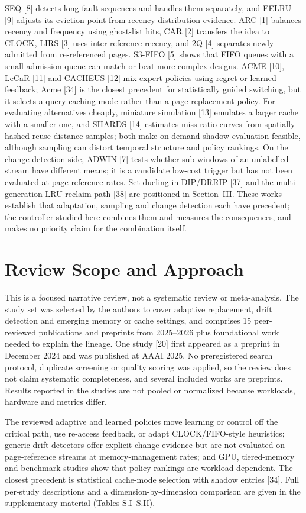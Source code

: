 \documentclass[10pt,twocolumn,a4paper]{IEEEtran}
\begin{document}
SEQ [8] detects long fault sequences and handles them separately, and EELRU
[9] adjusts its eviction point from recency-distribution evidence. ARC [1]
balances recency and frequency using ghost-list hits, CAR [2] transfers the
idea to CLOCK, LIRS [3] uses inter-reference recency, and 2Q [4] separates
newly admitted from re-referenced pages. S3-FIFO [5] shows that FIFO queues
with a small admission queue can match or beat more complex designs. ACME
[10], LeCaR [11] and CACHEUS [12] mix expert policies using regret or learned
feedback; Acme [34] is the closest precedent for statistically guided
switching, but it selects a query-caching mode rather than a page-replacement
policy. For evaluating alternatives cheaply, miniature simulation [13]
emulates a larger cache with a smaller one, and SHARDS [14] estimates
miss-ratio curves from spatially hashed reuse-distance samples; both make
on-demand shadow evaluation feasible, although sampling can distort temporal
structure and policy rankings. On the change-detection side, ADWIN [7] tests
whether sub-windows of an unlabelled stream have different means; it is a
candidate low-cost trigger but has not been evaluated at page-reference rates.
Set dueling in DIP/DRRIP [37] and the multi-generation LRU reclaim path [38]
are positioned in Section~III. These works establish that adaptation,
sampling and change detection each have precedent; the controller studied
here combines them and measures the consequences, and makes no priority claim
for the combination itself.

\section{Review Scope and Approach}
\label{sec:review}

This is a focused narrative review, not a systematic review or meta-analysis.
The study set was selected by the authors to cover adaptive replacement, drift
detection and emerging memory or cache settings, and comprises 15 peer-reviewed
publications and preprints from 2025--2026 plus foundational work needed to
explain the lineage. One study [20] first appeared as a preprint in December
2024 and was published at AAAI 2025. No preregistered search protocol,
duplicate screening or quality scoring was applied, so the review does not
claim systematic completeness, and several included works are preprints.
Results reported in the studies are not pooled or normalized because
workloads, hardware and metrics differ.

The reviewed adaptive and learned policies move learning or control off the
critical path, use re-access feedback, or adapt CLOCK/FIFO-style heuristics;
generic drift detectors offer explicit change evidence but are not evaluated on
page-reference streams at memory-management rates; and GPU, tiered-memory and
benchmark studies show that policy rankings are workload dependent. The closest
precedent is statistical cache-mode selection with shadow entries [34]. Full
per-study descriptions and a dimension-by-dimension comparison are given in the
supplementary material (Tables S.I--S.II).
\end{document}
